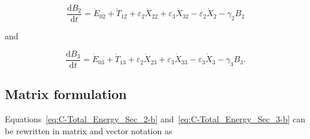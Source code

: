 \begin{equation} \label{eq:C-Total_Energy_Sec_2-b}
	\frac{\mathrm{d}B_{2}}{\mathrm{d}t}
	= \dot{E}_{02}
	+ \dot{T}_{12}
	+ \varepsilon_{2} \dot{X}_{22}
	+ \varepsilon_{3} \dot{X}_{32}
	- \varepsilon_{2} \dot{X}_{2}
	- \gamma_{2} B_{2}
\end{equation}

\noindent{}and

\begin{equation} \label{eq:C-Total_Energy_Sec_3-b}
	\frac{\mathrm{d}B_{3}}{\mathrm{d}t}
	= \dot{E}_{03}
	+ \dot{T}_{13}
	+ \varepsilon_{2} \dot{X}_{23}
	+ \varepsilon_{3} \dot{X}_{33}
	- \varepsilon_{3} \dot{X}_{3}
	- \gamma_{3} B_{3}.
\end{equation}


\subsection{Matrix formulation} %
\label{sec:C-matrix}

\noindent{}Equations~\ref{eq:C-Total_Energy_Sec_2-b} 
and~\ref{eq:C-Total_Energy_Sec_3-b} can be rewritten 
in matrix and vector notation as

